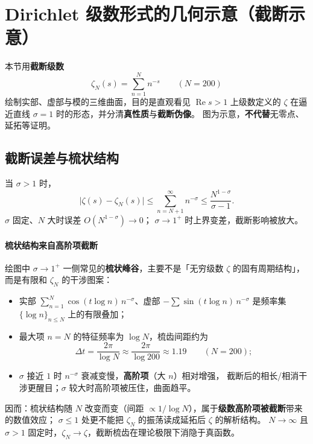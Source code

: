 \section{Dirichlet 级数形式的几何示意（截断示意）}
\label{sec:zeta_visualization}

本节用\textbf{截断级数}
\begin{equation}
  \zeta_N(s)=\sum_{n=1}^{N}n^{-s}
  \qquad(N=200)
\end{equation}
绘制实部、虚部与模的三维曲面，目的是直观看见 $\operatorname{Re}s>1$ 上级数定义的 $\zeta$
在逼近直线 $\sigma=1$ 时的形态，并分清\textbf{真性质}与\textbf{截断伪像}。
图为示意，\textbf{不代替}无零点、延拓等证明。

\subsection{截断误差与梳状结构}
\label{sec:trunc-error}

当 $\sigma>1$ 时，
\[
  \bigl|\zeta(s)-\zeta_N(s)\bigr|
  \le\sum_{n=N+1}^{\infty}n^{-\sigma}
  \le\frac{N^{1-\sigma}}{\sigma-1}.
\]
$\sigma$ 固定、$N$ 大时误差 $O(N^{1-\sigma})\to 0$；
$\sigma\to 1^+$ 时上界变差，截断影响被放大。

\paragraph{梳状结构来自高阶项截断}
绘图中 $\sigma\to 1^+$ 一侧常见的\textbf{梳状峰谷}，主要不是「无穷级数 $\zeta$ 的固有周期结构」，
而是有限和 $\zeta_N$ 的干涉图案：
\begin{itemize}
  \item 实部 $\sum_{n=1}^{N}\cos(t\log n)\,n^{-\sigma}$、虚部 $-\sum\sin(t\log n)\,n^{-\sigma}$
        是频率集 $\{\log n\}_{n\le N}$ 上的有限叠加；
  \item 最大项 $n=N$ 的特征频率为 $\log N$，梳齿间距约为
        \[
          \Delta t=\frac{2\pi}{\log N}
          \approx\frac{2\pi}{\log 200}\approx 1.19
          \qquad(N=200);
        \]
  \item $\sigma$ 接近 $1$ 时 $n^{-\sigma}$ 衰减变慢，\textbf{高阶项}（大 $n$）相对增强，
        截断后的相长/相消干涉更醒目；$\sigma$ 较大时高阶项被压住，曲面趋平。
\end{itemize}
因而：梳状结构随 $N$ 改变而变（间距 $\propto 1/\log N$），属于\textbf{级数高阶项被截断}带来的数值效应；
$\sigma\le 1$ 处更不能把 $\zeta_N$ 的振荡读成延拓后 $\zeta$ 的解析结构。
$N\to\infty$ 且 $\sigma>1$ 固定时，$\zeta_N\to\zeta$，截断梳齿在理论极限下消隐于真函数。

